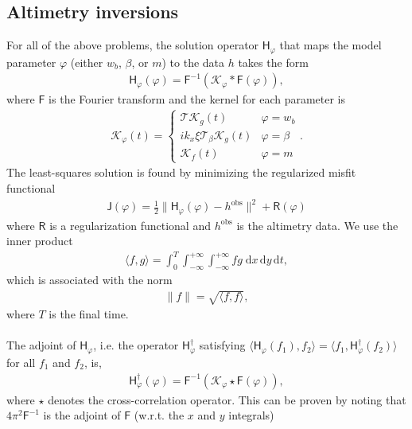 \documentclass[paper=a4, fontsize=11pt]{article}
\begin{document}
\subsection*{Altimetry inversions}
For all of the above problems, the solution operator $\mathsf{H}_\varphi$ that maps the model
parameter $\varphi$ (either $w_b$, $\beta$, or $m$) to the data $h$ takes the form
\begin{align}
\mathsf{H}_\varphi(\varphi) = \mathsf{F}^{-1} \left( \mathcal{K}_\varphi* \mathsf{F}(\varphi)\right),
\end{align}
where $\mathsf{F}$ is the Fourier transform and the kernel for each parameter is
\begin{align}
\mathcal{K}_\varphi(t) =
\begin{cases}
\mathcal{T}\mathcal{K}_g(t) & \varphi = w_b \\
ik_x\xi\mathcal{T}_{\beta}\mathcal{K}_g(t) & \varphi = \beta \\
\mathcal{K}_f(t) & \varphi = m
\end{cases} .
\end{align}
The least-squares solution is found by minimizing the regularized misfit functional
\begin{align}
\mathsf{J}(\varphi) = \frac{1}{2}\| \mathsf{H}_\varphi(\varphi) - h^{\mathrm{obs}} \|^2 + \mathsf{R}(\varphi) \label{lsq}
\end{align}
where $\mathsf{R}$ is a regularization functional and $h^{\mathrm{obs}}$ is the altimetry data.
We use the inner product
\begin{align}
\langle f,g\rangle = \int_0^T \int_{-\infty}^{+\infty} \int_{-\infty}^{+\infty} fg \;\mathrm{d}x\,\mathrm{d}y\,\mathrm{d}t,
\end{align}
which is associated with the norm
\begin{align}
\| f \| = \sqrt{\langle f,f\rangle},
\end{align}
where $T$ is the final time.
\\ \\
The adjoint of $\mathsf{H}_\varphi$, i.e. the operator $\mathsf{H}_\varphi^\dagger$  satisfying
$\langle \mathsf{H}_\varphi(f_1),f_2 \rangle = \langle f_1, \mathsf{H}_\varphi^\dagger(f_2)
\rangle$ for all $f_1$ and $f_2$, is,
\begin{align}
\mathsf{H}_\varphi^\dagger (\varphi) = \mathsf{F}^{-1} \left( \mathcal{K}_\varphi \star \mathsf{F}(\varphi)\right),
\end{align}
where $\star  $ denotes the cross-correlation operator.
This can be proven by noting that ${4\pi^2}\mathsf{F}^{-1}$ is the adjoint of $\mathsf{F}$ (w.r.t. the $x$ and $y$ integrals)
\end{document}
